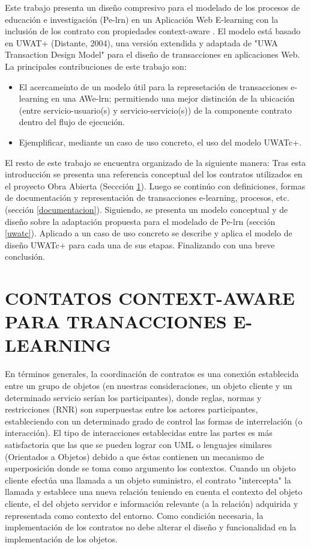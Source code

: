 \documentclass[12 pt,a4paper]{llncs}
\begin{document}
Este trabajo presenta un diseño compresivo para el modelado de los procesos de educación e investigación (Pe-lrn) en un Aplicación Web E-learning con la inclusión de los contrato con propiedades context-aware \cite{libro}. El modelo está basado en UWAT+ (Distante, 2004), una versión extendida y adaptada de "UWA Transaction Design Model" para el diseño de transacciones en aplicaciones Web. La principales contribuciones de este trabajo son:

\begin{itemize}
 \item El acercameinto de un modelo útil para la represetación de transacciones e-learning en una AWe-lrn; permitiendo una mejor distinción de la ubicación (entre servicio-usuario(s) y servicio-servicio(s)) de la componente contrato dentro del flujo de ejecución.
 \item Ejemplificar, mediante un caso de uso concreto,  el uso del modelo UWATc+.

\end{itemize}

El resto de este trabajo se encuentra organizado de la siguiente manera: Tras esta introducción se presenta una referencia conceptual del los contratos utilizados en el proyecto Obra Abierta (Seccción \ref{contrato}). Luego se continúo con definiciones, formas de documentación y representación de transacciones e-learning, procesos, etc. (sección \ref{documentacion}). Siguiendo, se presenta un modelo conceptual y de diseño sobre la adaptación propuesta para el modelado de Pe-lrn (sección \ref{uwatc}). Aplicado a un caso de uso concreto se describe y aplica el modelo de diseño UWATc+ para cada una de sus etapas. Finalizando con una breve conclusión.


\section{CONTATOS CONTEXT-AWARE PARA TRANACCIONES E-LEARNING} \label{contrato}

En términos generales, la coordinación de contratos es una conexión establecida entre un grupo de objetos (en nuestras consideraciones, un objeto cliente y un determinado servicio serían los participantes), donde reglas, normas y restricciones (RNR) son superpuestas entre los actores participantes, estableciendo con un determinado grado de control las formas de interrelación (o interacción). 
El tipo de interacciones establecidas entre las partes es más satisfactoria que las que se pueden lograr con UML o lenguajes similares (Orientados a Objetos) debido a que éstas contienen un mecanismo de superposición donde se toma como argumento los contextos. Cuando un objeto cliente efectúa una llamada a un objeto suministro, el contrato "intercepta" la llamada y establece una nueva relación teniendo en cuenta el contexto del objeto cliente, el del objeto servidor e información relevante (a la relación) adquirida y representada como contexto del entorno. Como condición necesaria, la implementación de los contratos no debe alterar el diseño y funcionalidad en la implementación de los objetos.
\end{document}
